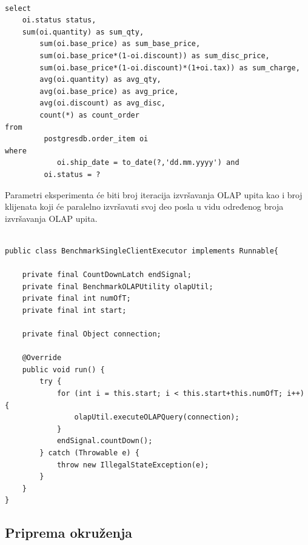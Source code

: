 \documentclass[12pt,oneside]{memoir}
\begin{document}

\begin{lstlisting}[title={executeOLAPQuery},captionpos=t]

select
	oi.status status,
	sum(oi.quantity) as sum_qty,
        sum(oi.base_price) as sum_base_price,
        sum(oi.base_price*(1-oi.discount)) as sum_disc_price,
        sum(oi.base_price*(1-oi.discount)*(1+oi.tax)) as sum_charge,
        avg(oi.quantity) as avg_qty,
        avg(oi.base_price) as avg_price,
        avg(oi.discount) as avg_disc,
        count(*) as count_order
from
         postgresdb.order_item oi
where
        	oi.ship_date = to_date(?,'dd.mm.yyyy') and
         oi.status = ?

\end{lstlisting}

Parametri eksperimenta će biti broj iteracija izvršavanja OLAP upita kao i broj klijenata koji će paralelno izvršavati svoj deo posla u vidu određenog broja izvršavanja OLAP upita.



\begin{lstlisting}[title={BenchmarkSingleClientExecutor.java},captionpos=t]

public class BenchmarkSingleClientExecutor implements Runnable{

    private final CountDownLatch endSignal;
    private final BenchmarkOLAPUtility olapUtil;
    private final int numOfT;
    private final int start;

    private final Object connection;

    @Override
    public void run() {
        try {
            for (int i = this.start; i < this.start+this.numOfT; i++) {
                olapUtil.executeOLAPQuery(connection);
            }
            endSignal.countDown();
        } catch (Throwable e) {
            throw new IllegalStateException(e);
        }
    }
}

\end{lstlisting}

\subsection{Priprema okruženja}
\end{document}
